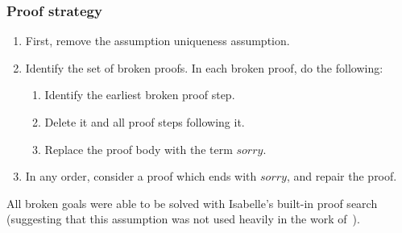 \documentclass[aspectratio=169,compress,handout]{beamer}
\begin{document}
  \begin{frame}
    \frametitle{Proof strategy}

    \begin{enumerate}[<+->]
      \item First, remove the assumption uniqueness assumption.
      \item Identify the set of broken proofs. In each broken proof, do the
        following:
        \begin{enumerate}[<+->]
          \item Identify the earliest broken proof step.
          \item Delete it and all proof steps following it.
          \item Replace the proof body with the term $sorry$.
        \end{enumerate}
      \item In any order, consider a proof which ends with $sorry$, and
        repair the proof.
    \end{enumerate}

    \pause

    All broken goals were able to be solved with Isabelle's built-in proof
    search (suggesting that this assumption was not used heavily in the work
    of~\citet{gomes17}).
  \end{frame}
\end{document}

